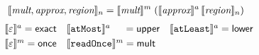 \begin{align*}
\setlength{\arraycolsep}{0.7em}
& \interp{\textit{mult}, \textit{approx}, \textit{region}}_n
= \interp{\textit{mult}}^m \; (\interp{\textit{approx}}^a \,
\interp{\textit{region}}_n)
\end{align*}
\vspace{-2em}
\setlength{\arraycolsep}{0.3em}
\begin{align*}
& \hspace{-0.5em}\begin{array}{lll}
\llbracket{\varepsilon}\rrbracket^{a}   = \textsf{exact} &
\llbracket{\texttt{atMost}}\rrbracket^{a} \hspace{1.3em} = \textsf{upper} &
\llbracket{\texttt{atLeast}}\rrbracket^{a} = \textsf{lower} \\[0.3em]
\llbracket{\varepsilon}\rrbracket^{m} = \textsf{once}
& \llbracket{\texttt{readOnce}}\rrbracket^{m} = \textsf{mult} &
\end{array}\\[-1.5em]
\end{align*}
%

